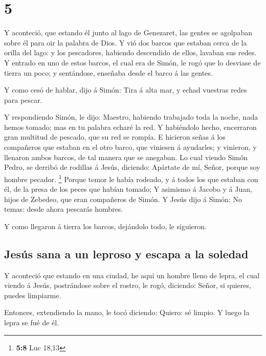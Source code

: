 \hypertarget{section-4}{%
\section{5}\label{section-4}}

 Y aconteció, que estando él junto al lago de Genezaret,
las gentes se agolpaban sobre él para oir la palabra de Dios.
 Y vió dos barcos que estaban cerca de la orilla del lago:
y los pescadores, habiendo descendido de ellos, lavaban sus redes.
 Y entrado en uno de estos barcos, el cual era de Simón,
le rogó que lo desviase de tierra un poco; y sentándose, enseñaba desde
el barco á las gentes.

 Y como cesó de hablar, dijo á Simón: Tira á alta mar, y
echad vuestras redes para pescar.

 Y respondiendo Simón, le dijo: Maestro, habiendo
trabajado toda la noche, nada hemos tomado; mas en tu palabra echaré la
red.  Y habiéndolo hecho, encerraron gran multitud de
pescado, que su red se rompía.  E hicieron señas á los
compañeros que estaban en el otro barco, que viniesen á ayudarles; y
vinieron, y llenaron ambos barcos, de tal manera que se anegaban.
 Lo cual viendo Simón Pedro, se derribó de rodillas á
Jesús, diciendo: Apártate de mí, Señor, porque soy hombre pecador.
\footnote{\textbf{5:8} Luc 18,13}  Porque temor le había
rodeado, y á todos los que estaban con él, de la presa de los peces que
habían tomado;  Y asimismo á Jacobo y á Juan, hijos de
Zebedeo, que eran compañeros de Simón. Y Jesús dijo á Simón: No temas:
desde ahora pescarás hombres.

 Y como llegaron á tierra los barcos, dejándolo todo, le
siguieron.

\hypertarget{jesuxfas-sana-a-un-leproso-y-escapa-a-la-soledad}{%
\subsection{Jesús sana a un leproso y escapa a la
soledad}\label{jesuxfas-sana-a-un-leproso-y-escapa-a-la-soledad}}

 Y aconteció que estando en una ciudad, he aquí un hombre
lleno de lepra, el cual viendo á Jesús, postrándose sobre el rostro, le
rogó, diciendo: Señor, si quieres, puedes limpiarme.

 Entonces, extendiendo la mano, le tocó diciendo: Quiero:
sé limpio. Y luego la lepra se fué de él.

